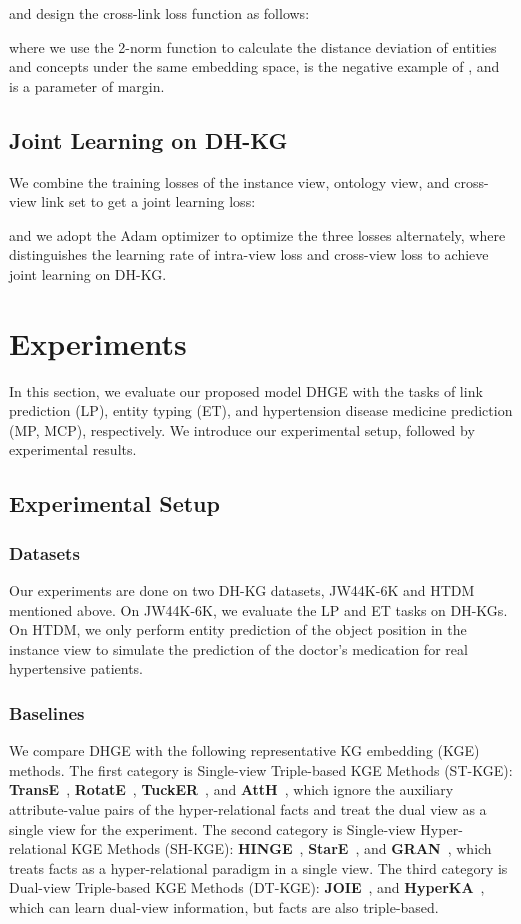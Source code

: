 \documentclass[letterpaper]{article} \usepackage{aaai23}  \usepackage{times}  \usepackage{helvet}  \usepackage{courier}  \usepackage[hyphens]{url}  \usepackage{graphicx} \urlstyle{rm} \def\UrlFont{\rm}  \usepackage{natbib}  \usepackage{caption} \frenchspacing  \setlength{\pdfpagewidth}{8.5in}  \setlength{\pdfpageheight}{11in}  \usepackage{times}
\begin{document}
and design the cross-link loss function as follows:

where we use the 2-norm function to calculate the distance deviation of entities and concepts under the same embedding space,  is the negative example of , and  is a parameter of margin.


\subsection{Joint Learning on DH-KG}

We combine the training losses of the instance view, ontology view, and cross-view link set to get a joint learning loss:

and we adopt the Adam optimizer to optimize the three losses alternately, where  distinguishes the learning rate of intra-view loss and cross-view loss to achieve joint learning on DH-KG.






\section{Experiments}
\label{s6}
In this section, we evaluate our proposed model DHGE with the tasks of link prediction (LP), entity typing (ET), and hypertension disease medicine prediction (MP, MCP), respectively. We introduce our experimental setup, followed by experimental results.
\subsection{Experimental Setup}
\label{6.1}
\subsubsection{Datasets}
Our experiments are done on two DH-KG datasets, JW44K-6K and HTDM mentioned above. On JW44K-6K, we evaluate the LP and ET tasks on DH-KGs. On HTDM, we only perform entity prediction of the object position in the instance view to simulate the prediction of the doctor's medication for real hypertensive patients. 

\subsubsection{Baselines}
We compare DHGE with the following representative KG embedding (KGE) methods. The first category is Single-view Triple-based KGE Methods (ST-KGE): \textbf{TransE}~\citep{TransE}, \textbf{RotatE}~\citep{RotatE}, \textbf{TuckER}~\citep{TuckER}, and \textbf{AttH}~\citep{AttH}, which ignore the auxiliary attribute-value pairs of the hyper-relational facts and treat the dual view as a single view for the experiment. The second category is Single-view Hyper-relational KGE Methods (SH-KGE): \textbf{HINGE}~\citep{HINGE}, \textbf{StarE}~\citep{StarE}, and \textbf{GRAN}~\citep{GRAN}, which treats facts as a hyper-relational paradigm in a single view. The third category is Dual-view Triple-based KGE Methods (DT-KGE): \textbf{JOIE}~\citep{JOIE}, and \textbf{HyperKA}~\citep{HyperKA}, which can learn dual-view information, but facts are also triple-based.
\end{document}
